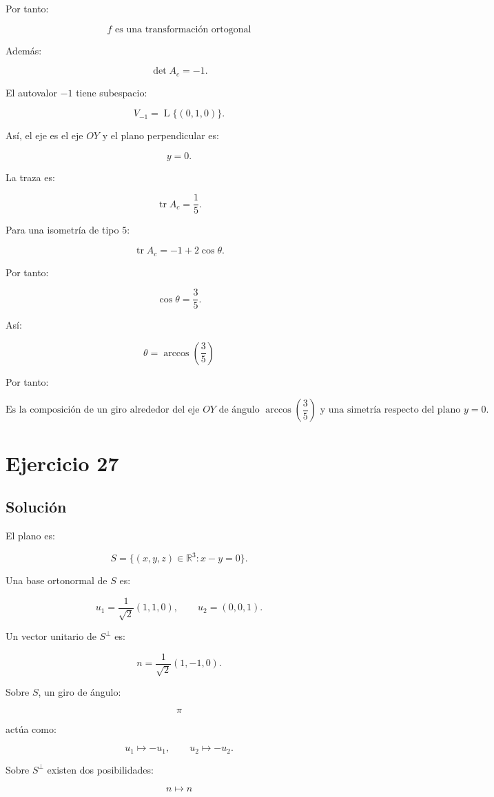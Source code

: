 \documentclass[11pt,a4paper]{article}
\newcommand{\R}{\mathbb{R}}
\newcommand{\tr}{\operatorname{tr}}
\newcommand{\Span}{\operatorname{L}}
\begin{document}
Por tanto:

\[
\boxed{
f\text{ es una transformación ortogonal}
}
\]

Además:

\[
\det A_c=-1.
\]

El autovalor \(-1\) tiene subespacio:

\[
V_{-1}
=
\Span\{(0,1,0)\}.
\]

Así, el eje es el eje \(OY\) y el plano perpendicular es:

\[
y=0.
\]

La traza es:

\[
\tr A_c
=
\frac15.
\]

Para una isometría de tipo \(5\):

\[
\tr A_c
=
-1+2\cos\theta.
\]

Por tanto:

\[
\cos\theta=\frac35.
\]

Así:

\[
\boxed{
\theta
=
\arccos\left(\frac35\right)
}
\]

Por tanto:

\[
\boxed{
\text{Es la composición de un giro alrededor del eje }OY
\text{ de ángulo }\arccos\left(\frac35\right)
\text{ y una simetría respecto del plano }y=0.
}
\]

\section{Ejercicio 27}
\subsection{Solución}

El plano es:

\[
S=
\{(x,y,z)\in\R^3:x-y=0\}.
\]

Una base ortonormal de \(S\) es:

\[
u_1=
\frac1{\sqrt2}(1,1,0),
\qquad
u_2=(0,0,1).
\]

Un vector unitario de \(S^\perp\) es:

\[
n=
\frac1{\sqrt2}(1,-1,0).
\]

Sobre \(S\), un giro de ángulo:

\[
\pi
\]

actúa como:

\[
u_1\mapsto-u_1,
\qquad
u_2\mapsto-u_2.
\]

Sobre \(S^\perp\) existen dos posibilidades:

\[
n\mapsto n
\]
\end{document}
